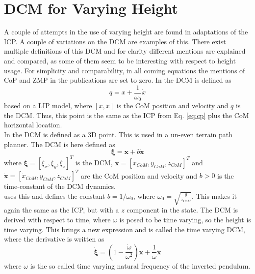 \section{\ac{DCM} for Varying Height}
A couple of attempts in the use of varying height are found in adaptations of the \ac{ICP}. A couple of variations on the \acf{DCM} are examples of this. There exist multiple definitions of this \ac{DCM} and for clarity different mentions are explained and compared, as some of them seem to be interesting with respect to height usage. For simplicity and comparability, in all coming equations the mentions of \ac{CoP} and \ac{ZMP} in the publications are set to zero. In \cite{takenaka2009real} the \ac{DCM} is defined as 
\begin{equation}
q = x + \frac{1}{\omega_0}\dot{x}
\label{eq:takenakadcm}
\end{equation} 
based on a \ac{LIP} model, where $[x,\dot{x}]$ is the \ac{CoM} position and velocity and $q$ is the \ac{DCM}. Thus, this point is the same as the \ac{ICP} from Eq. \eqref{eq:cp} plus the \ac{CoM} horizontal location. \\
In \cite{englsberger2013three} the \ac{DCM} is defined as a \ac{3D} point. This is used in a un-even terrain path planner. The \ac{DCM} is here defined as
\begin{equation}
\boldsymbol{\xi} = \boldsymbol{x} + b\boldsymbol{\dot{x}}
\label{eq:englsdcm}
\end{equation}
where $\boldsymbol{\xi}=[\xi_x,\xi_y,\xi_z]^T$ is the \ac{DCM}, $\boldsymbol{x}=[x_{CoM}, y_{CoM}, z_{CoM}]^T$ and $\boldsymbol{\dot{x}}=[\dot{x}_{CoM}, \dot{y}_{CoM}, \dot{z}_{CoM}]^T$ are the \ac{CoM} position and velocity and $b>0$ is the time-constant of the \ac{DCM} dynamics. \\
\cite{hopkins2014humanoid} uses this and defines the constant $b=1/\omega_0$, where $\omega_0=\sqrt{\frac{g}{z_{CoM}}}$. This makes it again the same as the \ac{ICP}, but with a $z$ component in the state. The \ac{DCM} is derived with respect to time, where $\omega$ is posed to be time varying, so the height is time varying. This brings a new expression and is called the time varying \ac{DCM}, where the derivative is written as
\begin{equation}
\boldsymbol{\dot{\xi}}=(1-\frac{\dot{\omega}}{\omega^2})\boldsymbol{\dot{x}}+\frac{1}{\omega}\boldsymbol{\ddot{x}}
\end{equation}
where $\omega$ is the so called time varying natural frequency of the inverted pendulum.\\
